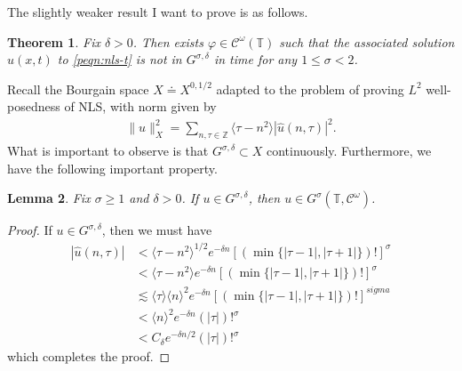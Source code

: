 \documentclass[12pt,reqno]{amsart}
\numberwithin{equation}{section}  %
\newcommand{\zz}{\mathbb{Z}}
\newcommand{\ci}{\mathbb{T}}
\newcommand{\wh}{\widehat}
\newcommand{\vp}{\varphi}
\newtheorem{theorem}{Theorem}[section]
\newtheorem{lemma}[theorem]{Lemma}
\begin{document}
%
%
The slightly weaker result I want to prove
is as follows.
%
\begin{theorem}
  Fix $\delta > 0$. Then exists
  $\vp \in  \mathcal{C}^\omega(\mathbb{T})$ such that the associated solution
  $u(x,t)$ to \eqref{peqn:nls-t} is not in $G^{\sigma, \delta}$
  in time for any $1 \le \sigma < 2$. 
\label{thm:sharp-weak}
\end{theorem}
%
Recall the Bourgain space $X \doteq X^{0,1/2}$ adapted to the problem of proving
$L^{2}$ well-posedness of
NLS, with norm given by
%
\begin{equation*}
  \begin{split}
    \| u \|_{X}^{2} = \sum_{n, \tau \in \zz} \langle \tau - n^{2} \rangle 
    | \wh{u}(n, \tau) |^{2}.
  \end{split}
\end{equation*}
%
%
What is important to observe is that $G^{\sigma, \delta} \subset X$
continuously. Furthermore, we have the following important property. %
%
%
%
%
%
%
%
\begin{lemma}
  Fix $\sigma \ge 1$ and $\delta > 0$.
  If $u \in G^{\sigma, \delta}$, then $u \in G^{\sigma}(\ci,
  \mathcal{C}^{\omega})$.
\label{lem:main-space-embed}
\end{lemma}
%
%
%
\begin{proof}
  If $u \in G^{\sigma, \delta}$, then we must have
  \begin{equation*}
    \begin{split}
      | \wh{u}(n, \tau) |
      & <  \langle \tau - n^{2} \rangle^{1/2}    e^{-\delta n}
      [(\min \{|\tau -1 |, |\tau + 1|\})!]^{\sigma}
      \\
      & <  \langle \tau - n^{2} \rangle e^{-\delta n}
      [(\min \{ |\tau -1 |, |\tau + 1| \})!]^{\sigma}
      \\
      & \lesssim \langle \tau \rangle \langle n \rangle ^{2}
      e^{-\delta n}
      [(\min \{ |\tau -1 |, |\tau + 1| \})!]^{sigma}
      \\
      & < \langle n \rangle ^{2}
      e^{-\delta n}
      (| \tau |)!^{\sigma}
      \\
      & < C_{\delta} e^{-\delta n/2} (| \tau |)!^{\sigma}
    \end{split}
  \end{equation*}
  which completes the proof. 
\end{proof}
%
%
%
\end{document}

